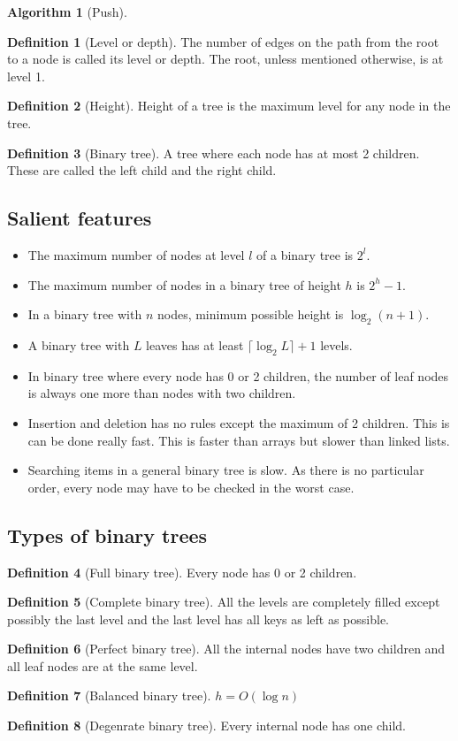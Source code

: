 \documentclass[10pt, a4paper]{extarticle}
\theoremstyle{definition}
\newtheorem{alg}{Algorithm}
\newtheorem{defn}{Definition}
\begin{document}
\begin{alg}[Push]
	\begin{defn}[Level or depth]
		The number of edges on the path from the root to a node is called its level or depth. The root, unless mentioned otherwise, is at level 1.
	\end{defn}

	\begin{defn}[Height]
		Height of a tree is the maximum level for any node in the tree.
	\end{defn}
	\begin{defn}[Binary tree]
		A tree where each node has at most 2 children. These are called the left child and the right child.
	\end{defn}
	\subsection{Salient features}
	\begin{itemize}
		\item The maximum number of nodes at level $l$ of a binary tree is $2^l$. 
		\item The maximum number of nodes in a binary tree of height $h$ is $2^h-1$.
		\item In a binary tree with $n$ nodes, minimum possible height is $\log_2(n+1)$.
		\item A binary tree with $L$ leaves has at least $\lceil\log_2L\rceil+1$ levels.
		\item In binary tree where every node has 0 or 2 children, the number of leaf nodes is always one more than nodes with two children.
		\item Insertion and deletion has no rules except the maximum of 2 children. This is can be done really fast. This is faster than arrays but slower than linked lists.
		\item Searching items in a general binary tree is slow. As there is no particular order, every node may have to be checked in the worst case. 
	\end{itemize}
	\subsection{Types of binary trees}
	\begin{defn}[Full binary tree]
		Every node has 0 or 2 children.
	\end{defn}
	\begin{defn}[Complete binary tree]
		All the levels are completely filled except possibly the last level and the last level has all keys as left as possible. 
	\end{defn}
	\begin{defn}[Perfect binary tree]
		All the internal nodes have two children and all leaf nodes are at the same level. 
	\end{defn}
	\begin{defn}[Balanced binary tree]
		$h=O(\log n)$
	\end{defn}
	\begin{defn}[Degenrate binary tree]
	Every internal node has one child.
	\end{defn}

\end{alg}
\end{document}
